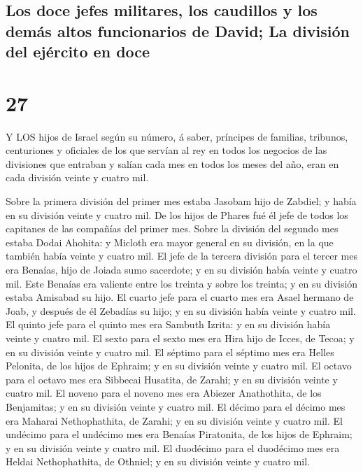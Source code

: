 \hypertarget{los-doce-jefes-militares-los-caudillos-y-los-demuxe1s-altos-funcionarios-de-david-la-divisiuxf3n-del-ejuxe9rcito-en-doce}{%
\subsection{Los doce jefes militares, los caudillos y los demás altos
funcionarios de David; La división del ejército en
doce}\label{los-doce-jefes-militares-los-caudillos-y-los-demuxe1s-altos-funcionarios-de-david-la-divisiuxf3n-del-ejuxe9rcito-en-doce}}

\hypertarget{section-26}{%
\section{27}\label{section-26}}

 Y LOS hijos de Israel según su número, á saber, príncipes
de familias, tribunos, centuriones y oficiales de los que servían al rey
en todos los negocios de las divisiones que entraban y salían cada mes
en todos los meses del año, eran en cada división veinte y cuatro mil.

 Sobre la primera división del primer mes estaba Jasobam
hijo de Zabdiel; y había en su división veinte y cuatro mil.
 De los hijos de Phares fué él jefe de todos los capitanes
de las compañías del primer mes.  Sobre la división del
segundo mes estaba Dodai Ahohita: y Micloth era mayor general en su
división, en la que también había veinte y cuatro mil.  El
jefe de la tercera división para el tercer mes era Benaías, hijo de
Joiada sumo sacerdote; y en su división había veinte y cuatro mil.
 Este Benaías era valiente entre los treinta y sobre los
treinta; y en su división estaba Amisabad su hijo.  El
cuarto jefe para el cuarto mes era Asael hermano de Joab, y después de
él Zebadías su hijo; y en su división había veinte y cuatro mil.
 El quinto jefe para el quinto mes era Sambuth Izrita: y en
su división había veinte y cuatro mil.  El sexto para el
sexto mes era Hira hijo de Icces, de Tecoa; y en su división veinte y
cuatro mil.  El séptimo para el séptimo mes era Helles
Pelonita, de los hijos de Ephraim; y en su división veinte y cuatro mil.
 El octavo para el octavo mes era Sibbecai Husatita, de
Zarahi; y en su división veinte y cuatro mil.  El noveno
para el noveno mes era Abiezer Anathothita, de los Benjamitas; y en su
división veinte y cuatro mil.  El décimo para el décimo mes
era Maharai Nethophathita, de Zarahi; y en su división veinte y cuatro
mil.  El undécimo para el undécimo mes era Benaías
Piratonita, de los hijos de Ephraim; y en su división veinte y cuatro
mil.  El duodécimo para el duodécimo mes era Heldai
Nethophathita, de Othniel; y en su división veinte y cuatro mil.

